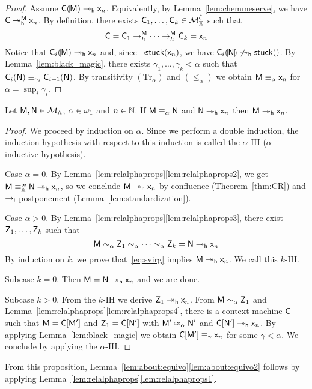 \begin{proof} Assume $\C\hole{\mM}\reddh\mach{x}_n$. Equivalently, by Lemma~\ref{lem:chemmeserve}, we have $\C\reddh^\mM\mach{x}_n$.
By definition, there exists $\C_1,\dots,\C_k\in\cMX$ such that
\[
	\C = \C_1\to_h^\mM\cdots\to_h^\mM \C_k = \mach{x}_n
\]
Notice that $\C_i\hole{\mM}\reddh \mach{x}_n$ and, since $\lnot\stuck{\mach{x}_n}$, we have $\C_i\hole{\mN}\not\reddh\stuck{}$.
By Lemma~\ref{lem:black_magic}, there exists $\gamma_1,\dots,\gamma_k<\alpha$ such that $\C_i\hole{\mN}\eq[\gamma_i]\C_{i+1}\hole{\mN}$.
By transitivity $(\mathrm{Tr}_\alpha)$ and $(\le_\alpha)$ we obtain $\mM\eq\mach{x}_n$ for $\alpha = \sup_i{\gamma_i}$.
\end{proof}

\begin{prop} Let $\mM,\mN\in\cM$, $\alpha\in\Count$ and $n\in\nat$.
If $\mM\eq \mN$ and $\mN\reddh\mach{x}_n$ then $\mM\reddh\mach{x}_n$.
\end{prop}

\begin{proof} We proceed by induction on $\alpha$. Since we perform a double induction, the induction hypothesis with respect to this induction is called the $\alpha$-IH ($\alpha$-inductive hypothesis).

Case $\alpha = 0$. By Lemma~\ref{lem:relalphaprops}\ref{lem:relalphaprops2}, we get $\mM\equivea \mN\reddh\mach{x}_n$, so we conclude $\mM\reddh\mach{x}_n$ by confluence (Theorem~\ref{thm:CR}) and $\red[i]$-postponement (Lemma~\ref{lem:standardization}).

Case $\alpha > 0$. By Lemma~\ref{lem:relalphaprops}\ref{lem:relalphaprops3}, there exist $\mZ_1,\dots,\mZ_k$ such that
\begin{equation}\label{eq:svirg}
	\mM \svirg\mZ_1\svirg\cdots\svirg\mZ_k=\mN\reddh\mach{x}_n
\end{equation}
By induction on $k$, we prove that~\eqref{eq:svirg} implies $\mM\reddh\mach{x}_n$.
We call this $k$-IH\@.

Subcase $k =0$. Then $\mM =\mN\reddh\mach{x}_n$ and we are done.

Subcase $k >0$. From the $k$-IH we derive $\mZ_1\reddh\mach{x}_n$.
From $\mM\svirg\mZ_1$ and Lemma~\ref{lem:relalphaprops}\ref{lem:relalphaprops4}, there is a context-machine $\C$ such that $\mM = \C[\mM']$ and $\mZ_1 = \C[\mN']$ with $\mM'\pesc\mN'$ and $\C[\mN']\reddh\mach{x}_n$.
By applying Lemma~\ref{lem:black_magic} we obtain $\C[\mM'] \eq[\gamma] \mach{x}_n$ for some $\gamma<\alpha$.
We conclude by applying the $\alpha$-IH\@.
\end{proof}

From this proposition, Lemma~\ref{lem:about:equivo}\ref{lem:about:equivo2} follows by applying Lemma~\ref{lem:relalphaprops}\ref{lem:relalphaprops1}.
